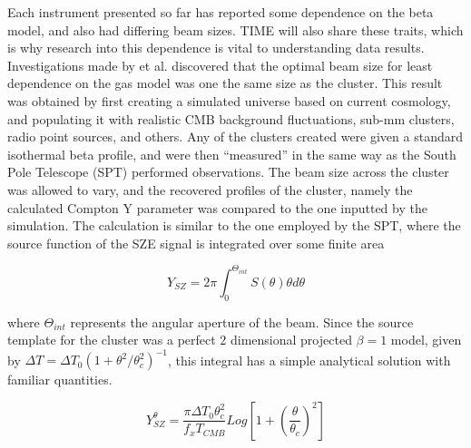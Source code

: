 \documentclass[manuscript]{aastex}
\begin{document}
Each instrument presented so far has reported some dependence on the beta model, and also had differing beam sizes. TIME will also share these traits, which is why research into this dependence is vital to understanding data results. Investigations made by \cite{Saliwanchik2015} et al. discovered that the optimal beam size for least dependence on the gas model was one the same size as the cluster. This result was obtained by first creating a simulated universe based on current cosmology, and populating it with realistic CMB background fluctuations, sub-mm clusters, radio point sources, and others. Any of the clusters created were given a standard isothermal beta profile, and were then ``measured'' in the same way as the South Pole Telescope (SPT) performed observations. The beam size across the cluster was allowed to vary, and the recovered profiles of the cluster, namely the calculated Compton Y parameter was compared to the one inputted by the simulation. The calculation is similar to the one employed by the SPT, where the source function of the SZE signal is integrated over some finite area

\begin{equation}
Y_{SZ} = 2\pi \int_{0}^{\Theta_{int}} S(\theta) \theta d\theta
\end{equation}

where $\Theta_{int}$ represents the angular aperture of the beam. Since the source template for the cluster was a perfect 2 dimensional projected $\beta = 1$ model, given by $\Delta T = \Delta T_{0}(1 + \theta^{2}/\theta_{c}^{2})^{-1}$, this integral has a simple analytical solution with familiar quantities. 

\begin{equation}
Y_{SZ}^{\theta} = \frac{\pi \Delta T_{0} \theta_{c}^{2}}{f_{x} T_{CMB}} Log[1 + (\frac{\theta}{\theta_{c}})^{2}]
\end{equation}
\end{document}
